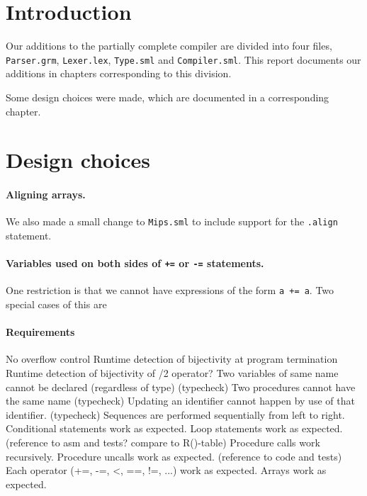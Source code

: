 \section{Introduction}
Our additions to the partially complete compiler are divided into four
files, {\tt Parser.grm}, {\tt Lexer.lex}, {\tt Type.sml} and {\tt Compiler.sml}.
This report documents our additions in chapters corresponding to this division.

Some design choices were made, which are documented in a corresponding chapter.

\section{Design choices}

\paragraph{Aligning arrays.}
We also made a small change to {\tt Mips.sml} to include support for the
{\tt .align} statement.

\paragraph{Variables used on both sides of {\tt +=} or {\tt -=} statements.}
One restriction is that we cannot have expressions of the form \verb!a += a!.
Two special cases of this are

\paragraph{Requirements}

No overflow control
Runtime detection of bijectivity at program termination
Runtime detection of bijectivity of /2 operator?
Two variables of same name cannot be declared (regardless of type) (typecheck)
Two procedures cannot have the same name (typecheck)
Updating an identifier cannot happen by use of that identifier. (typecheck)
Sequences are performed sequentially from left to right.
Conditional statements work as expected.
Loop statements work as expected. (reference to asm and tests? compare to R()-table)
Procedure calls work recursively.
Procedure uncalls work as expected. (reference to code and tests)
Each operator (+=, -=, <, ==, !=, ...) work as expected.
Arrays work as expected.


